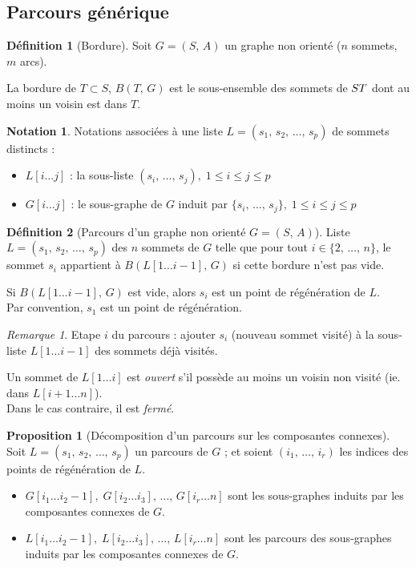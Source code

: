 \documentclass[11pt,english,french]{scrreprt}
\theoremstyle{remark}
\newtheorem*{rem*}{Remarque}
\theoremstyle{definition}
\newtheorem*{def*}{Définition}
\newtheorem*{prop*}{Proposition}
\newtheorem*{not*}{Notation}
\begin{document}
\subsection{Parcours générique} %

\begin{def*}[Bordure]
	Soit $G=(S,\,A)$ un graphe non orienté ($n$ sommets, $m$ arcs).
	
	La bordure de $T\subset S$, $B(T,\,G)$ est le sous-ensemble des sommets de $S\\T$ dont au moins un voisin est dans $T$.  
\end{def*}

\begin{not*}
	Notations associées à une liste $L=(s_1,\,s_2,\,\dots,\,s_p)$ de sommets distincts :\begin{itemize}
		\item $L[i\dots j]$ : la sous-liste $(s_i,\,\dots,\,s_j),\;1\leqslant i\leqslant j\leqslant p$
		\item $G[i\dots j]$ : le sous-graphe de $G$ induit par $\{s_i,\,\dots,\,s_j\},\;1\leqslant i\leqslant j\leqslant p$
	\end{itemize}
\end{not*}

\begin{def*}[Parcours d'un graphe non orienté $G=(S,\,A)$]
	Liste $L=(s_1,\,s_2,\,\dots,\,s_p)$ des $n$ sommets de $G$ telle que pour tout $i\in\{2,\,\dots,\,n\}$, le sommet $s_i$ appartient à $B(L[1\dots i-1],\,G)$ si cette bordure n'est pas vide.		
	
	Si $B(L[1\dots i-1],\,G)$ est vide, alors $s_i$ est un point de régénération de $L$.\\
	Par convention, $s_1$ est un point de régénération.
\end{def*}

\begin{rem*}
	Etape $i$ du parcours : ajouter $s_i$ (nouveau sommet visité) à la sous-liste $L[1\dots i-1]$ des sommets déjà visités.
\end{rem*}

Un sommet de $L[1\dots i]$ est \emph{ouvert} s'il possède au moins un voisin non visité (ie. dans $L[i+1\dots n]$).\\
Dans le cas contraire, il est \emph{fermé}.

\begin{prop*}[Décomposition d'un parcours sur les composantes connexes]
	Soit $L=(s_1,\,s_2,\,\dots,\,s_p)$ un parcours de $G$ ; et soient $(i_1,\,\dots,\,i_r)$ les indices des points de régénération de $L$.
	\begin{itemize}
		\item $G[i_1\dots i_2-1],\;G[i_2\dots i_3],\,\dots,\,G[i_r\dots n]$ sont les sous-graphes induits par les composantes connexes de $G$.
		\item $L[i_1\dots i_2-1],\;L[i_2\dots i_3],\,\dots,\,L[i_r\dots n]$ sont les parcours des sous-graphes induits par les composantes connexes de $G$.
	\end{itemize}
\end{prop*}
\end{document}
